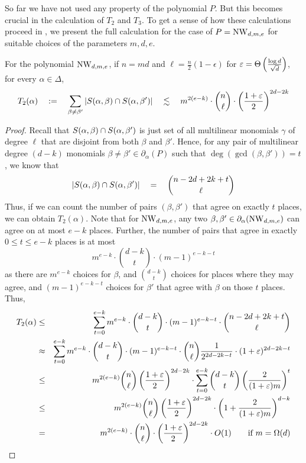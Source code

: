 So far we have not used any property of the polynomial $P$. 
But this becomes crucial in the calculation of $T_2$ and $T_3$. 
To get a sense of how these calculations proceed in \cite{KS14}, we present the full calculation for the case of $P = \operatorname{\mathrm{NW}}_{d,m,e}$ for suitable choices of the parameters $m,d,e$. 
\begin{lemma}[\cite{KS14}]\label{lem:T_2-for-NW}
For the polynomial $\operatorname{\mathrm{NW}}_{d,m,e}$, if $n = md$ and $\ell = \frac{n}{2}(1 - \epsilon)$ for $\varepsilon = \Theta\left(\frac{\log d}{\sqrt{d}}\right)$, for every $\alpha \in \Delta$, 
\[
T_2(\alpha)\quad := \quad \sum_{\beta\neq \beta'}\left|S(\alpha, \beta)\cap S(\alpha, \beta')\right| \quad \lesssim \quad m^{2(e-k)}\cdot \binom{n}{\ell} \cdot \left(\frac{1+\varepsilon}{2}\right)^{2d -2k} 
\]
\end{lemma}
\begin{proof}
Recall that $S(\alpha,\beta) \cap S(\alpha,\beta')$ is just set of all multilinear monomials $\gamma$ of degree $\ell$ that are disjoint from both $\beta$ and $\beta'$.
Hence, for any pair of multilinear degree $(d-k)$ monomials $\beta \neq \beta' \in \partial_\alpha(P)$ such that $\deg(\gcd(\beta, \beta')) = t$, we know that 
\[
\left|S(\alpha, \beta)\cap S(\alpha, \beta')\right| \quad = \quad \binom{n - 2d + 2k +t}{\ell}
\]
Thus, if we can count the number of pairs $(\beta, \beta')$ that agree on exactly $t$ places, we can obtain $T_2(\alpha)$. 
Note that for $\operatorname{\mathrm{NW}}_{d,m,e}$, any two $\beta, \beta' \in\partial_\alpha(\operatorname{\mathrm{NW}}_{d,m,e})$ can agree on at most $e-k$ places. 
Further, the number of pairs that agree in exactly $0\leq t\leq e-k$ places is at most
\[
m^{e-k} \cdot \binom{d-k}{t} \cdot (m-1)^{e-k-t}
\]
as there are $m^{e-k}$ choices for $\beta$, and $\binom{d-k}{t}$ choices for places where they may agree, and $(m-1)^{e-k-t}$ choices for $\beta'$ that agree with $\beta$ on those $t$ places. 
Thus,
\begin{eqnarray*}
T_2(\alpha) &\leq& \sum_{t=0}^{e-k} m^{e-k} \cdot \binom{d-k}{t} \cdot (m-1)^{e-k-t} \cdot  \binom{n - 2d + 2k +t}{\ell}\\
& \approx  & \sum_{t=0}^{e-k} m^{e-k} \cdot \binom{d-k}{t} \cdot (m-1)^{e-k-t} \cdot  \binom{n}{\ell} \frac{1}{2^{2d-2k -t}}\cdot (1+\varepsilon)^{2d - 2k - t}\\
& \leq & m^{2(e-k)}\binom{n}{\ell}\left(\frac{1+\varepsilon}{2}\right)^{2d -2k}\cdot\sum_{t=0}^{e-k}\binom{d-k}{t}\left(\frac{2}{(1+\varepsilon)m}\right)^t\\
& \leq & m^{2(e-k)}\binom{n}{\ell}\left(\frac{1+\varepsilon}{2}\right)^{2d -2k}\cdot \left(1+\frac{2}{(1+\varepsilon)m}\right)^{d-k}\\
& = & m^{2(e-k)}\cdot \binom{n}{\ell} \cdot \left(\frac{1+\varepsilon}{2}\right)^{2d -2k}\cdot O(1) \qquad\text{if $m = \Omega(d)$}\qedhere
\end{eqnarray*}
\end{proof}
